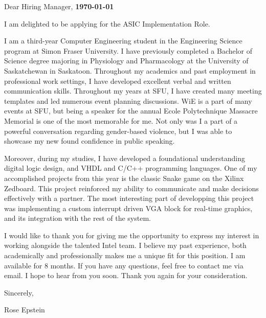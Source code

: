 \documentclass[letterpaper,11pt]{article}
\newcommand{\roleName}{ASIC Implementation Role}
\begin{document}
    \vspace*{10pt}
    \par Dear Hiring Manager,  \hfill \textbf{\today}
    \vspace*{10pt}
    \par I am delighted to be applying for the \roleName{}.
    \vspace*{10pt}
    \par I am a third-year Computer Engineering student in the Engineering Science program at Simon Fraser University. I have 
    previously completed a Bachelor of Science degree majoring in Physiology and Pharmacology at the University of Saskatchewan in Saskatoon.
    Throughout my academics and past employment in professional work settings, I have developed excellent verbal and written communication skills. 
    Throughout my years at SFU, I have created many meeting templates and led numerous event planning discussions. 
    WiE is a part of many events at SFU, but being a speaker for the annual Ecole Polytechnique Massacre Memorial is one of the most memorable for me. 
    Not only was I a part of a powerful conversation regarding gender-based violence, but I was able to showcase my new found confidence in public speaking. 
    \vspace*{10pt}
    \par Moreover, during my studies, I have developed a foundational understanding digital logic design, and VHDL and C/C++ programming languages. One of my accomplished projects from this year is the classic Snake game
    on the Xilinx Zedboard. This project reinforced my ability to communicate and make decisions effectively with a partner. 
    The most interesting part of developping this project was implementing a custom interrupt driven VGA block for real-time graphics, 
    and its integration with the rest of the system.
    \vspace*{10pt}
    \par I would like to thank you for giving me the opportunity to express my interest in working alongside
    the talented Intel team. I believe my past experience, both academically and professionally makes
    me a unique fit for this position. I am available for 8 months. If you have any questions, feel free to contact me via email. I hope to hear from you
    soon. Thank you again for your consideration.
    \vspace*{10pt}
    \par Sincerely,
    \par Rose Epstein
\end{document}
